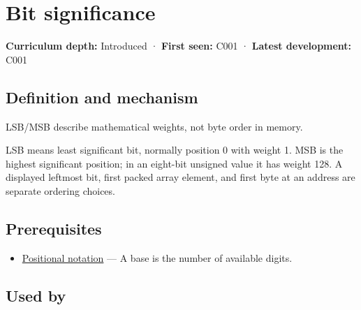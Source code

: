 \hypertarget{appendix-280445746493}{}\label{referencestart:appendix-280445746493}
\section{Bit significance}\label{appendix-280445746493-bit-significance}

\hypertarget{appendix-280445746493-bit-significance}{}

\textbf{Curriculum depth:} Introduced · \textbf{First seen:} C001 · \textbf{Latest development:} C001

\begin{allmightroledefinition}

\subsection{Definition and mechanism}\label{appendix-280445746493-definition-and-mechanism}

\hypertarget{appendix-280445746493-definition-and-mechanism}{}

LSB/MSB describe mathematical weights, not byte order in memory.

\end{allmightroledefinition}

LSB means least significant bit, normally position 0 with weight 1. MSB is the highest significant position; in an eight-bit unsigned value it has weight 128. A displayed leftmost bit, first packed array element, and first byte at an address are separate ordering choices.

\subsection{Prerequisites}\label{appendix-280445746493-prerequisites}

\hypertarget{appendix-280445746493-prerequisites}{}

\begin{itemize}
\tightlist
\item
  \hyperref[appendix-83c3f28f7bda]{Positional notation} --- A base is the number of available digits.
\end{itemize}

\subsection{Used by}\label{appendix-280445746493-used-by}

\hypertarget{appendix-280445746493-used-by}{}

